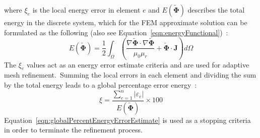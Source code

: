 where $\xi_{e}$ is the local energy error in element $e$ and $E(\tilde{\mathbf{\Phi}})$ describes the total energy in the discrete system, which for the FEM approximate solution can be formulated as the following (also see Equation~\ref{eqn:energyFunctional})~\cite{ansys2010}:\
\begin{equation}
	E(\tilde{\mathbf{\Phi}}) = \frac{1}{2}\int_{\Omega}\left(\frac{\nabla \tilde{\mathbf{\Phi}} \cdot \nabla \tilde{\mathbf{\Phi}}}{\mu_{0}\mu_{r}}+\tilde{\mathbf{\Phi}} \cdot \mathbf{J} \right)d\Omega
	\label{eqn:totalEnergy}
\end{equation}
The $\xi_{e}$ values act as an energy error estimate criteria and are used for adaptive mesh refinement.\ Summing the local errors in each element and dividing the sum by the total energy leads to a global percentage error energy~\cite{ansys2010}:\
\begin{equation}
	\xi = \frac{\sum_{e=1}^{n}|\varepsilon_{e}|}{E(\tilde{\mathbf{\Phi}})} \times 100
	\label{eqn:globalPercentEnergyErrorEstimate}
\end{equation}
Equation~\ref{eqn:globalPercentEnergyErrorEstimate} is used as a stopping criteria in order to terminate the refinement process.\
%

